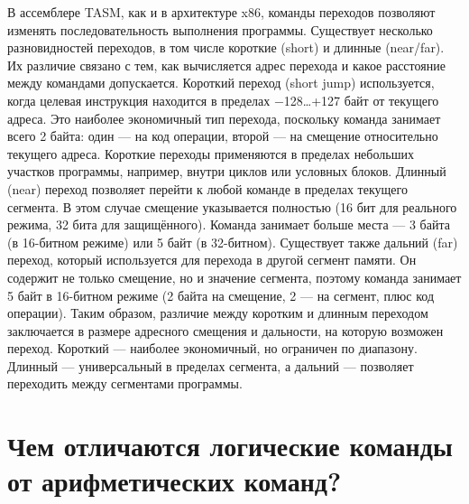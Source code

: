 В ассемблере TASM, как и в архитектуре x86, команды переходов позволяют изменять последовательность выполнения программы. Существует несколько разновидностей переходов, в том числе короткие (short) и длинные (near/far). Их различие связано с тем, как вычисляется адрес перехода и какое расстояние между командами допускается.
Короткий переход (short jump) используется, когда целевая инструкция находится в пределах −128…+127 байт от текущего адреса. Это наиболее экономичный тип перехода, поскольку команда занимает всего 2 байта: один — на код операции, второй — на смещение относительно текущего адреса. Короткие переходы применяются в пределах небольших участков программы, например, внутри циклов или условных блоков.
Длинный (near) переход позволяет перейти к любой команде в пределах текущего сегмента. В этом случае смещение указывается полностью (16 бит для реального режима, 32 бита для защищённого). Команда занимает больше места — 3 байта (в 16-битном режиме) или 5 байт (в 32-битном).
Существует также дальний (far) переход, который используется для перехода в другой сегмент памяти. Он содержит не только смещение, но и значение сегмента, поэтому команда занимает 5 байт в 16-битном режиме (2 байта на смещение, 2 — на сегмент, плюс код операции).
Таким образом, различие между коротким и длинным переходом заключается в размере адресного смещения и дальности, на которую возможен переход. Короткий — наиболее экономичный, но ограничен по диапазону. Длинный — универсальный в пределах сегмента, а дальний — позволяет переходить между сегментами программы.

\section{Чем отличаются логические команды от арифметических команд?}

